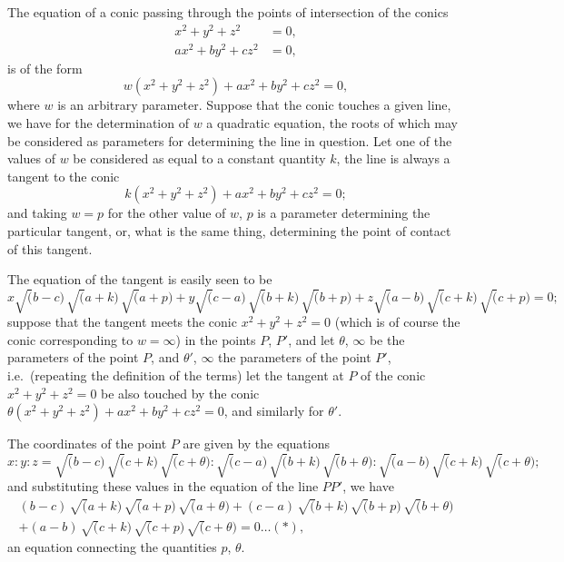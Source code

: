 \documentclass[11pt,a4paper]{book}
\begin{document}
The equation of a conic passing through the points of intersection of the conics
\begin{align*}
x^2 + y^2 + z^2 &= 0,\\
ax^2 + by^2 + cz^2 &= 0,
\end{align*}
is of the form
\[
w(x^2+y^2+z^2) + ax^2 + by^2 + cz^2 = 0,
\]
where $w$ is an arbitrary parameter. Suppose that the conic touches a given line, we have for the determination of $w$ a quadratic equation, the roots of which may be considered as parameters for determining the line in question. Let one of the values of $w$ be considered as equal to a constant quantity $k$, the line is always a tangent to the conic
\[
k(x^2+y^2+z^2) + ax^2 + by^2 + cz^2 = 0;
\]
and taking $w=p$ for the other value of $w$, $p$ is a parameter determining the particular tangent, or, what is the same thing, determining the point of contact of this tangent.

The equation of the tangent is easily seen to be
\[
x\surd(b-c)\,\surd(a+k)\,\surd(a+p) + y\surd(c-a)\,\surd(b+k)\,\surd(b+p) + z\surd(a-b)\,\surd(c+k)\,\surd(c+p) = 0;
\]
suppose that the tangent meets the conic $x^2+y^2+z^2=0$ (which is of course the conic corresponding to $w=\infty$) in the points $P$, $P'$, and let $\theta$, $\infty$ be the parameters of the point $P$, and $\theta'$, $\infty$ the parameters of the point $P'$, i.e.\ (repeating the definition of the terms) let the tangent at $P$ of the conic $x^2+y^2+z^2=0$ be also touched by the conic $\theta(x^2+y^2+z^2)+ax^2+by^2+cz^2=0$, and similarly for $\theta'$.

The coordinates of the point $P$ are given by the equations
\[
x : y : z = \surd(b-c)\,\surd(c+k)\,\surd(c+\theta) : \surd(c-a)\,\surd(b+k)\,\surd(b+\theta) : \surd(a-b)\,\surd(c+k)\,\surd(c+\theta);
\]
and substituting these values in the equation of the line $PP'$, we have
\begin{multline*}
(b-c)\,\surd(a+k)\,\surd(a+p)\,\surd(a+\theta) + (c-a)\,\surd(b+k)\,\surd(b+p)\,\surd(b+\theta)\\
+ (a-b)\,\surd(c+k)\,\surd(c+p)\,\surd(c+\theta) = 0\ldots(*),
\end{multline*}
an equation connecting the quantities $p$, $\theta$.
\end{document}
